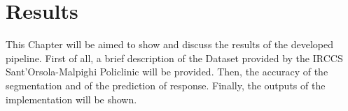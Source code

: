 \documentclass{standalone}
\begin{document}
\chapter{Results}
This Chapter will be aimed to show and discuss the results of the developed pipeline.
First of all, a brief description of the Dataset provided by the IRCCS Sant’Orsola-Malpighi Policlinic will be provided.
Then, the accuracy of the segmentation and of the prediction of response.
Finally, the outputs of the implementation will be shown.
\end{document}
